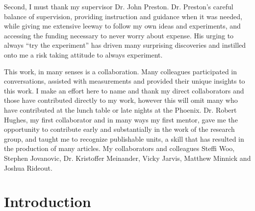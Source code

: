 \documentclass[letterpaper,12pt,twoside]{report}
\begin{document}
    Second, I must thank my supervisor Dr. John Preston. Dr. Preston's careful balance of supervision, providing instruction and guidance when it was needed, while giving me extensive leeway to follow my own ideas and experiments, and accessing the funding necessary to never worry about expense.
    His urging to always ``try the experiment'' has driven many surprising discoveries and instilled onto me a risk taking attitude to always experiment.
    
    This work, in many senses is a collaboration. Many colleagues participated in conversations, assisted with measurements and provided their unique insights to this work. I make an effort here to name and thank my direct collaborators and those have contributed directly to my work, however this will omit many who have contributed at the lunch table or late nights at the Phoenix. Dr. Robert Hughes, my first collaborator and in many ways my first mentor, gave me the opportunity to contribute early and substantially in the work of the research group, and taught me to recognize publishable units, a skill that has resulted in the production of many articles. My collaborators and colleagues Steffi Woo, Stephen Jovanovic, Dr. Kristoffer Meinander, Vicky Jarvis, Matthew Minnick and Joshua Rideout.
    
    \newpage
    \tableofcontents
    \listoffigures
    \newpage

    \pagestyle{fancy}
    \fancyhead{}
    \fancyfoot{}
    \fancyfoot[CE,CO]{\thepage}

    \lstset{%
basicstyle=\footnotesize\ttfamily,
breaklines=true,
tabsize=2,
frame=single
}



\chapter{Introduction}

\end{document}
